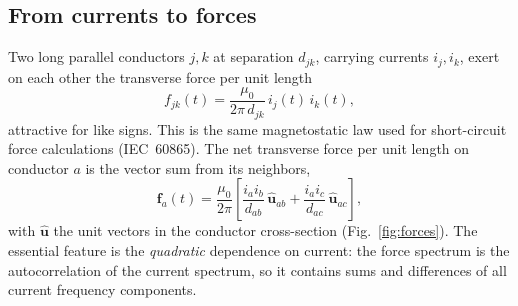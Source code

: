 \documentclass[11pt,a4paper,oneside]{book}
\begin{document}
\begin{onehalfspace}
\begin{appendices}
\section{From currents to forces}
Two long parallel conductors $j,k$ at separation $d_{jk}$, carrying currents
$i_j,i_k$, exert on each other the transverse force per unit length
\begin{equation}
	f_{jk}(t)=\frac{\mu_0}{2\pi\,d_{jk}}\,i_j(t)\,i_k(t),
	\label{eq:ampere}
\end{equation}
attractive for like signs. This is the same magnetostatic law used for
short-circuit force calculations (IEC~60865). The net transverse force per unit
length on conductor $a$ is the vector sum from its neighbors,
\begin{equation}
	\bm{f}_a(t)=\frac{\mu_0}{2\pi}\left[
	\frac{i_a i_b}{d_{ab}}\,\hat{\bm{u}}_{ab}
	+\frac{i_a i_c}{d_{ac}}\,\hat{\bm{u}}_{ac}\right],
	\label{eq:fnet}
\end{equation}
with $\hat{\bm{u}}$ the unit vectors in the conductor cross-section
(Fig.~\ref{fig:forces}). The essential feature is the \emph{quadratic} dependence
on current: the force spectrum is the autocorrelation of the current spectrum, so
it contains sums and differences of all current frequency components.


\end{appendices}
\end{onehalfspace}
\end{document}

